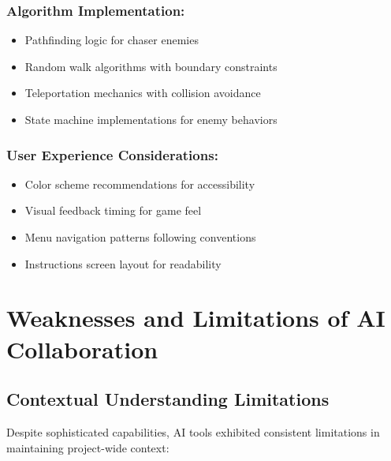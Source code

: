 \documentclass[12pt,a4paper]{article}
\begin{document}
\subsubsection*{Algorithm Implementation:}
\begin{itemize}
    \item Pathfinding logic for chaser enemies
    \item Random walk algorithms with boundary constraints
    \item Teleportation mechanics with collision avoidance
    \item State machine implementations for enemy behaviors
\end{itemize}

\subsubsection*{User Experience Considerations:}
\begin{itemize}
    \item Color scheme recommendations for accessibility
    \item Visual feedback timing for game feel
    \item Menu navigation patterns following conventions
    \item Instructions screen layout for readability
\end{itemize}

\newpage

\section{Weaknesses and Limitations of AI Collaboration}

\subsection{Contextual Understanding Limitations}

Despite sophisticated capabilities, AI tools exhibited consistent limitations in maintaining project-wide context:
\end{document}
